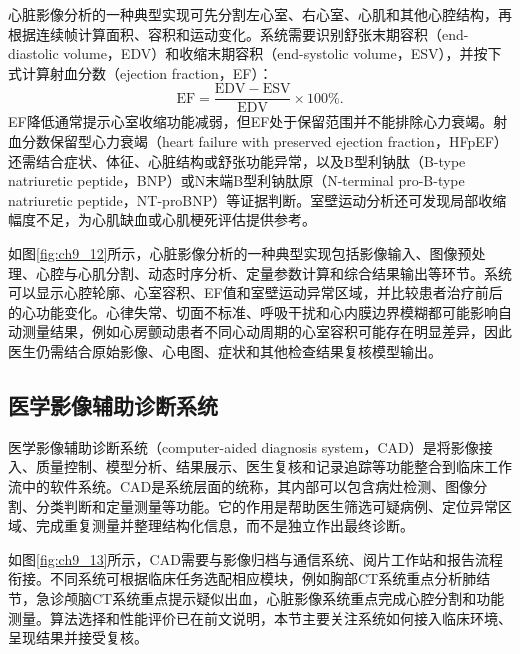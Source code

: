 心脏影像分析的一种典型实现可先分割左心室、右心室、心肌和其他心腔结构，再根据连续帧计算面积、容积和运动变化。系统需要识别舒张末期容积（end-diastolic volume，EDV）和收缩末期容积（end-systolic volume，ESV），并按下式计算射血分数（ejection fraction，EF）：
\[
\mathrm{EF}=\frac{\mathrm{EDV}-\mathrm{ESV}}{\mathrm{EDV}}\times100\%.
\]
EF降低通常提示心室收缩功能减弱，但EF处于保留范围并不能排除心力衰竭。射血分数保留型心力衰竭（heart failure with preserved ejection fraction，HFpEF）还需结合症状、体征、心脏结构或舒张功能异常，以及B型利钠肽（B-type natriuretic peptide，BNP）或N末端B型利钠肽原（N-terminal pro-B-type natriuretic peptide，NT-proBNP）等证据判断。室壁运动分析还可发现局部收缩幅度不足，为心肌缺血或心肌梗死评估提供参考。

如图\ref{fig:ch9_12}所示，心脏影像分析的一种典型实现包括影像输入、图像预处理、心腔与心肌分割、动态时序分析、定量参数计算和综合结果输出等环节。系统可以显示心腔轮廓、心室容积、EF值和室壁运动异常区域，并比较患者治疗前后的心功能变化。心律失常、切面不标准、呼吸干扰和心内膜边界模糊都可能影响自动测量结果，例如心房颤动患者不同心动周期的心室容积可能存在明显差异，因此医生仍需结合原始影像、心电图、症状和其他检查结果复核模型输出。

\par
\noindent\begin{minipage}{\textwidth}
\centering
{}
\label{fig:ch9_12}
\end{minipage}
\par

\subsection{医学影像辅助诊断系统}

医学影像辅助诊断系统（computer-aided diagnosis system，CAD）是将影像接入、质量控制、模型分析、结果展示、医生复核和记录追踪等功能整合到临床工作流中的软件系统。CAD是系统层面的统称，其内部可以包含病灶检测、图像分割、分类判断和定量测量等功能。它的作用是帮助医生筛选可疑病例、定位异常区域、完成重复测量并整理结构化信息，而不是独立作出最终诊断。

如图\ref{fig:ch9_13}所示，CAD需要与影像归档与通信系统、阅片工作站和报告流程衔接。不同系统可根据临床任务选配相应模块，例如胸部CT系统重点分析肺结节，急诊颅脑CT系统重点提示疑似出血，心脏影像系统重点完成心腔分割和功能测量。算法选择和性能评价已在前文说明，本节主要关注系统如何接入临床环境、呈现结果并接受复核。

